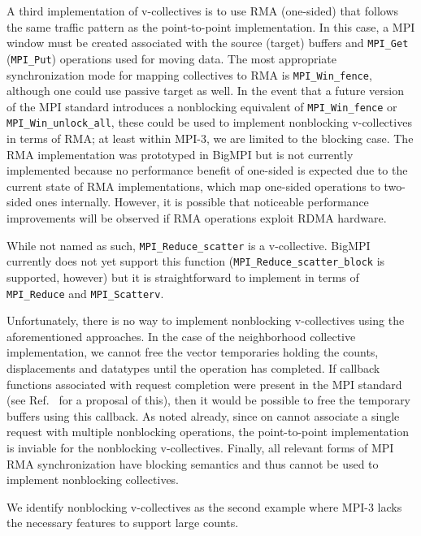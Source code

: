 A third implementation of v-collectives is to use RMA (one-sided) that follows
the same traffic pattern as the point-to-point implementation.
In this case, a MPI window must be created associated with the source (target)
buffers and \texttt{MPI\_Get} (\texttt{MPI\_Put}) operations used for moving data.
The most appropriate synchronization mode for mapping collectives to RMA
is \texttt{MPI\_Win\_fence}, although one could use passive target as well.
In the event that a future version of the MPI standard introduces a nonblocking
equivalent of \texttt{MPI\_Win\_fence} or \texttt{MPI\_Win\_unlock\_all}, these
could be used to implement nonblocking v-collectives in terms of RMA; 
at least within MPI-3, we are limited to the blocking case.
The RMA implementation was prototyped in BigMPI but is not currently implemented
because no performance benefit of one-sided is expected due to the current state
of RMA implementations, which map one-sided operations to two-sided ones internally.
However, it is possible that noticeable performance improvements will be
observed if RMA operations exploit RDMA hardware.

While not named as such, \texttt{MPI\_Reduce\_scatter} is a v-collective.
BigMPI currently does not yet support this function
(\texttt{MPI\_Reduce\_scatter\_block} is supported, however)
but it is straightforward to implement in terms of  \texttt{MPI\_Reduce} and
\texttt{MPI\_Scatterv}.



Unfortunately, there is no way to implement nonblocking v-collectives using 
the aforementioned approaches.  In the case of the neighborhood collective
implementation, we cannot free the vector temporaries holding the counts,
displacements and datatypes until the operation has completed.
If callback functions associated with request completion were present in the
MPI standard (see Ref.~\cite{ticket26} for a proposal of this), then it would
be possible to free the temporary buffers using this callback.
As noted already, since on cannot associate a single request with multiple
nonblocking operations, the point-to-point implementation is inviable
for the nonblocking v-collectives.
Finally, all relevant forms of MPI RMA synchronization have blocking semantics
and thus cannot be used to implement nonblocking collectives.

We identify nonblocking v-collectives as the second example
where MPI-3 lacks the necessary features to support large counts.